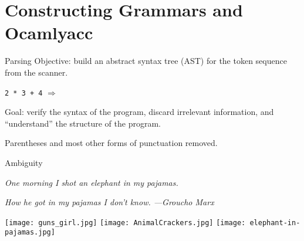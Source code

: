 \documentclass{plt}
\def\plus#1#2{node {\texttt{+}} child {#1} child {#2}}
\def\mult#1#2{node {\texttt{*}} child {#1} child {#2}}
\def\lit#1{node {#1}}
\begin{document}
\part{Constructing Grammars and Ocamlyacc}

\begin{frame}{Parsing}
Objective: build an abstract syntax tree (AST) for the token sequence
from the scanner.

\begin{center}
\texttt{2 * 3 + 4} \hspace{3pc} $\Rightarrow$ \hspace{3pc}
\end{center}

\medskip

Goal: verify the syntax of the program, discard irrelevant
information, and ``understand'' the structure of the program.

Parentheses and most other forms of punctuation removed.

\end{frame}

\begin{frame}{Ambiguity}

\centerline{\emph{One morning I shot an elephant in my pajamas.}}

\pause

\centerline{\emph{How he got in my pajamas I don't know. ---Groucho Marx}}

\vfill

\texttt{[image: guns\_girl.jpg]} \hfill
\texttt{[image: AnimalCrackers.jpg]} \hfill
\texttt{[image: elephant-in-pajamas.jpg]}

\end{frame}
\end{document}
